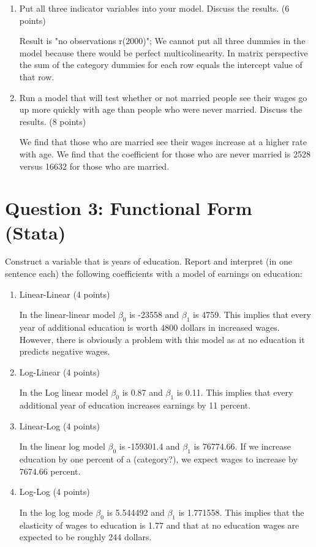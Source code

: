 \documentclass{article}
\begin{document}
\begin{enumerate}[label=\alph*]
\item  Put all three indicator variables into your model. Discuss the results. (6 points)

Result is "no observations r(2000)"; We cannot put all three dummies in the 
model because there would be perfect multicolinearity. In matrix perspective the sum of the category dummies for each row equals the intercept value of that row.

\item Run a model that will test whether or not married people see their wages go up
more quickly with age than people who were never married. Discuss the results.
(8 points)

We find that those who are married see their wages increase at a higher rate with age.  We find that the coefficient for those who are never married is 2528 versus 16632 for those who are married.  

\end{enumerate}

\section{Question 3:  Functional Form (Stata)}
Construct a variable that is years of education. Report and interpret (in one sentence each) the following coefficients with a model of earnings on education:

\begin{enumerate}[label=\alph*]

\item Linear-Linear (4 points)

In the linear-linear model $\beta_0$ is -23558 and $\beta_1$ is 4759.  This implies that every year of additional education is worth 4800 dollars in increased wages.  However, there is obviously a problem with this model as at no education it predicts negative wages.

\item Log-Linear (4 points)

In the Log linear model $\beta_0$ is 0.87 and $\beta_1$ is 0.11.  This implies that every additional year of education increases earnings by 11 percent.

\item Linear-Log (4 points)

In the linear log model $\beta_0$ is -159301.4  and $\beta_1$ is 76774.66.  If we increase education by one percent of a (category?), we expect wages to increase by 7674.66 percent. 

\item Log-Log (4 points)

In the log log mode $\beta_0$ is  5.544492 and $\beta_1$ is  1.771558.  This implies that the elasticity of wages to education is 1.77 and that at no education wages are expected to be roughly 244 dollars.

\end{enumerate}
\end{document}
